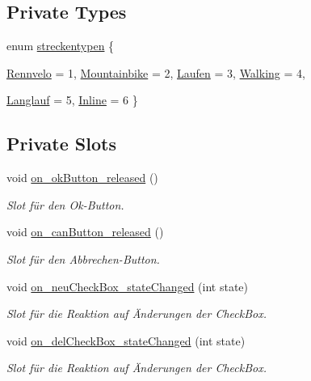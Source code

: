 \subsection*{Private Types}
\begin{CompactItemize}
\item 
enum \hyperlink{class_logfile_lesen_dialog_f385013205b5ac8ad353d598e3ea4662}{streckentypen} \{ \par
\hyperlink{class_logfile_lesen_dialog_f385013205b5ac8ad353d598e3ea4662771375c879ad9d49391a189e9615efc4}{Rennvelo} = 1, 
\hyperlink{class_logfile_lesen_dialog_f385013205b5ac8ad353d598e3ea46625ae6fb671052ec288e1376b14877ba5b}{Mountainbike} = 2, 
\hyperlink{class_logfile_lesen_dialog_f385013205b5ac8ad353d598e3ea4662ad9e15143bc96d0edf1ca75908fb5921}{Laufen} = 3, 
\hyperlink{class_logfile_lesen_dialog_f385013205b5ac8ad353d598e3ea4662f904b39e902869ed6d57fddc4afab35f}{Walking} = 4, 
\par
\hyperlink{class_logfile_lesen_dialog_f385013205b5ac8ad353d598e3ea46626e82677f8ad67277e8220a3dc24c1cee}{Langlauf} = 5, 
\hyperlink{class_logfile_lesen_dialog_f385013205b5ac8ad353d598e3ea4662d388b1716741ed4655d837a38989e861}{Inline} = 6
 \}
\end{CompactItemize}
\subsection*{Private Slots}
\begin{CompactItemize}
\item 
void \hyperlink{class_logfile_lesen_dialog_3ec935f830a6ab5cbab8a26f472df991}{on\_\-okButton\_\-released} ()
\begin{CompactList}\small\item\em Slot für den Ok-Button. \item\end{CompactList}\item 
void \hyperlink{class_logfile_lesen_dialog_bb7a15f0816b93d9ef3c8f044952d3f9}{on\_\-canButton\_\-released} ()
\begin{CompactList}\small\item\em Slot für den Abbrechen-Button. \item\end{CompactList}\item 
void \hyperlink{class_logfile_lesen_dialog_04e5cfc7ccc5a9e9f3b085de0f1f2bce}{on\_\-neuCheckBox\_\-stateChanged} (int state)
\begin{CompactList}\small\item\em Slot für die Reaktion auf Änderungen der CheckBox. \item\end{CompactList}\item 
void \hyperlink{class_logfile_lesen_dialog_bb303eb1d6f62d71c020c155de3e2f96}{on\_\-delCheckBox\_\-stateChanged} (int state)
\begin{CompactList}\small\item\em Slot für die Reaktion auf Änderungen der CheckBox. \item\end{CompactList}\end{CompactItemize}
